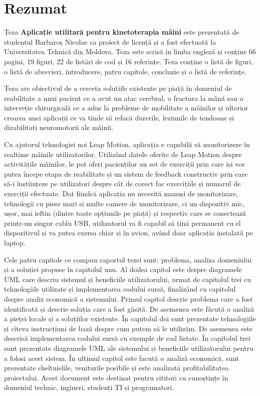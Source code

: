 \section*{Rezumat}

Teza \textbf{Aplicație utilitară pentru kinetoterapia mâini} este prezentată de studentul Barbaroș Nicolae ca proiect de licență și a fost efectuată la Universitatea Tehnică din Moldova. Teza este scrisă in limba engleză și conține 66 pagini, 19 figuri, 22 de listări de cod și 16 referințe. Teza conține o listă de figuri, o listă de abrevieri, introducere, patru capitole, concluzie și o listă de referințe.



Teza are obiectivul de a cerceta solutiile existente pe piață în domeniul de reabilitate a unui pacient ce a avut un atac cerebral, o fractura la mână sau o interveție chirurgicală ce a adus la probleme de mobilitate a mâinilor și ulterior crearea unei aplicații ce va tinde să refacă durerile, leziunile de tendoane și dizabilitati neuromotorii ale mâinii.

Cu ajutorul tehnologiei noi Leap Motion, aplicația e capabilă să monitorizeze în realtime mâinile utilizatorilor. Utilizând datele oferite de Leap Motion despre activitățile mâinilor, le pot oferi pacienților un set de exerciții prin care iși vor putea începe etapa de reabilitate și un sistem de feedback constructiv prin care să-i înștiințeze pe utilizatori despre cât de corect fac exercițiile și numarul de exerciții efectuate. Dat fiindcă aplicația nu necesită manuși de monitorizare, tehnologii cu piese mari si multe camere de monitorizare, ci un dispozitiv mic, ușor, mai ieftin (dintre toate opțiunile pe piață) și respectiv care se conectează printr-un singur cablu USB, utilizatorul va fi capabil să țină permanent cu el dispozitivul și va putea exersa chiar și în avion, având doar aplicația instalată pe laptop.


Cele patru capitole ce compun raportul tezei sunt: problema, analiza domeniului și a soluției propuse în capitolul unu. Al doilea capitol este despre diagramele UML care descriu sistemul și beneficiile utilizatorului, urmat de capitolul trei cu tehnologiile utilizate și implementarea codului sursă, finalizând cu capitolul despre analiz economică a sistemului. Primul capitol descrie problema care a fost identificată și descrie soluția care a fost găsită. De asemenea este făcută o analiză a pieței locale și a soluțiilor existente. În capitolul doi sunt prezentate tehnologiile și cîteva instrucțiuni de bază despre cum putem să le utilizăm. De asemenea este descrisă implementarea codului sursă cu exemple de cod listate. În capitolul trei sunt prezentate diagramele UML ale sistemului și beneficiile utilizatorului pentru a folosi acest sistem. În ultimul capitol este facută o analiză economică, sunt prezentate cheltuielile, veniturile posibile și este analizată profitabilitatea proiectului. Acest document este destinat pentru cititori cu cunoștințe în domeniul technic, ingineri, studenți TI și programatori.
